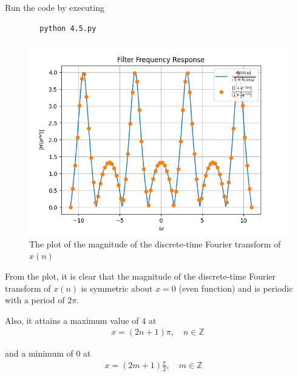 \documentclass[journal,12pt,twocolumn]{IEEEtran}
\providecommand{\brak}[1]{\ensuremath{\left(#1\right)}}
\numberwithin{equation}{section}
\renewcommand\thesection{\arabic{section}}
\begin{document}
\begin{enumerate}[label=\thesection.\arabic*]
	Run the code by executing
	\begin{lstlisting}
		python 4.5.py
	\end{lstlisting}

	\begin{figure}[!ht]
		\centering
		\includegraphics[width=\columnwidth]{./figs/4.5.png}
		\caption{The plot of the magnitude of the discrete-time Fourier transform of $x(n)$}
		\label{fig-4.5}	
	\end{figure}

	From the plot, it is clear that the magnitude of the discrete-time Fourier transform of $x(n)$ is symmetric about $x = 0$ (even function) and is periodic with a period of $2\pi$. 
	
	Also, it attains a maximum value of $4$ at 
	\begin{align}
		x = (2n + 1)\pi, \quad n \in \mathbb{Z}
	\end{align} 
	
	and a minimum of $0$ at 
	\begin{align} 
		x = \brak{2m + 1}\frac{\pi}{2}, \quad m \in \mathbb{Z}\quad 
	\end{align}
	
	\end{enumerate}
	
\end{document}
